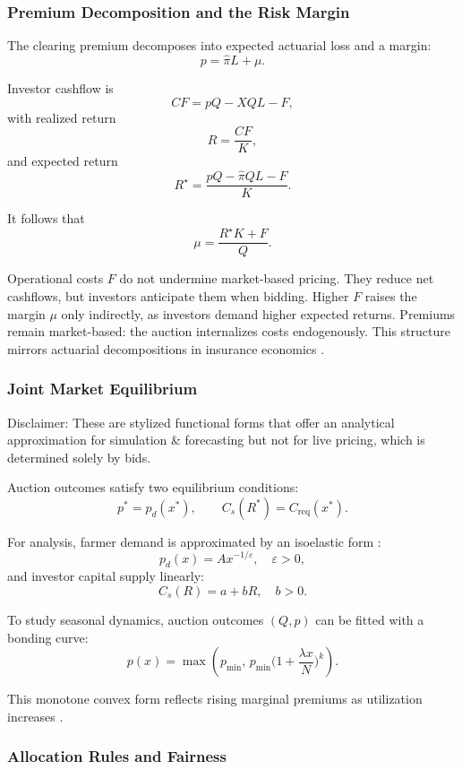 \documentclass[11pt,a4paper]{article}
\begin{document}
	\subsubsection{Premium Decomposition and the Risk Margin}

The clearing premium decomposes into expected actuarial loss and a margin:
\[
p = \hat{\pi}L + \mu.
\]

Investor cashflow is
\[
CF = pQ - XQL - F,
\]
with realized return
\[
R = \frac{CF}{K},
\]
and expected return
\[
R^\star = \frac{pQ - \hat{\pi}QL - F}{K}.
\]

It follows that
\[
\mu = \frac{R^\star K + F}{Q}.
\]

Operational costs $F$ do not undermine market-based pricing. They reduce net cashflows, but investors anticipate them when bidding. Higher $F$ raises the margin $\mu$ only indirectly, as investors demand higher expected returns. Premiums remain market-based: the auction internalizes costs endogenously. This structure mirrors actuarial decompositions in insurance economics \citep{bowers1997actuarial,cummins2009catastrophe}.  

	\subsubsection{Joint Market Equilibrium}

Disclaimer: These are stylized functional forms that offer an analytical approximation for simulation & forecasting but not for live pricing, which is determined solely by bids.

Auction outcomes satisfy two equilibrium conditions:
\[
p^\ast = p_d(x^\ast), \qquad C_s(R^\ast) = C_{\mathrm{req}}(x^\ast).
\]

For analysis, farmer demand is approximated by an isoelastic form \citep{mascolell1995microeconomic,varian1992micro}:
\[
p_d(x) = A x^{-1/\varepsilon}, \quad \varepsilon > 0,
\]
and investor capital supply linearly:
\[
C_s(R) = a + bR, \quad b > 0.
\]  

To study seasonal dynamics, auction outcomes $(Q,p)$ can be fitted with a bonding curve:
\[
p(x) = \max\!\left(p_{\min},\, p_{\min}\Big(1+\frac{\lambda x}{N}\Big)^k\right).
\]

This monotone convex form reflects rising marginal premiums as utilization increases \citep{angeris2020improved,shiller2003bond}. 

	\subsubsection{Allocation Rules and Fairness}
\end{document}
